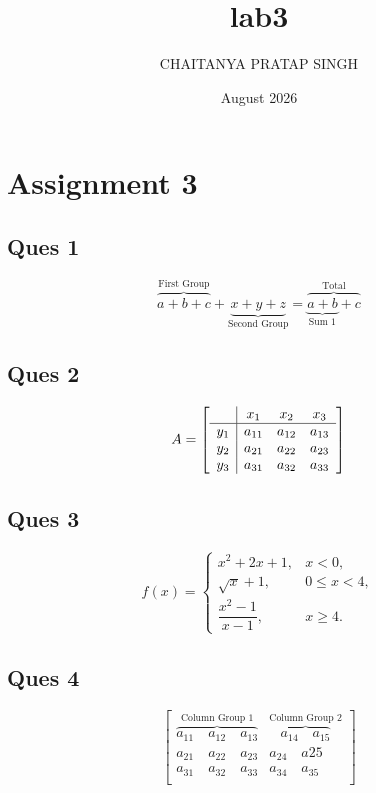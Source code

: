 \documentclass{article}
\title{lab3}
\author{CHAITANYA PRATAP SINGH}
\date{August 2026}
\begin{document}
\maketitle

\section{Assignment 3}

\subsection{\textbf{Ques 1}}
\[\overbrace{a+b+c}^{\text{First Group}}
+
\underbrace{x+y+z}_{\text{Second Group}} 
=
\overbrace{\underbrace{a+b}_{\text{Sum 1}}+c}^{\text{Total}}\]


\subsection{\textbf{Ques 2}}
\[
A = 
\left[
\begin{array}{c | ccc}
 & x_1 & x_2 & x_3 \\ \hline
 y_1 & a_{11} & a_{12} & a_{13} \\
 y_2 & a_{21} & a_{22} & a_{23} \\
 y_3 & a_{31} & a_{32} & a_{33}
 \end{array}
 \right]
 \]

 \subsection{\textbf{Ques 3}}
 \[
 f(x)=
 \begin{cases}
 x^2+2x+1, & x<0, \\[4pt]
 \sqrt{x}+1, & 0\leq x<4, \\[4pt]
 \dfrac{x^2-1}{x-1}, & x\geq4.
 \end{cases}
 \]


\subsection{\textbf{Ques 4}}
 \[
 \left[
 \begin{array}{ccccc}
 \overbrace{a_{11}\quad a_{12}\quad
 a_{13}}^{\text{Column Group 1}}
 & 
 \overbrace{a_{14}\quad a_{15}}^{\text{Column Group 2}} 
 \\
 a_{21}\quad a_{22}\quad a_{23} & a_{24}\quad a{25}\\
 a_{31}\quad a_{32}\quad a_{33} & a_{34}\quad a_{35}\\
 \end{array}
 \right]
 \]
\end{document}
